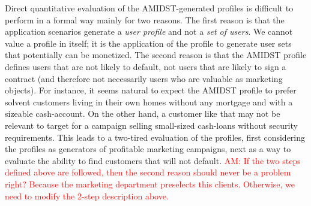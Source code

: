 \documentclass{article}
\theoremstyle{theorem}
\theoremstyle{definition}
\begin{document}
Direct quantitative evaluation of the AMIDST-generated profiles is difficult to perform in a formal way mainly for two reasons. The first reason is that the application scenarios generate a \textit{user profile} and not a \textit{set of users}. 
We cannot value a profile in itself; it is the application of the profile to generate user sets that potentially can be monetized. The second reason is that the AMIDST profile defines users that are not likely to default, not users that are likely to sign a contract (and therefore not necessarily users who are valuable as marketing objects). For instance, it seems natural to expect the AMIDST profile to prefer solvent customers living in their own homes without any mortgage and with a sizeable cash-account. On the other hand, a customer like that may not be relevant to target for a campaign selling small-sized cash-loans without security requirements. This leads to a two-tired evaluation of the profiles, first considering the profiles as generators of profitable marketing campaigns, next as a way to evaluate the ability to find customers that will not default.
\textcolor{red}{AM: If the two steps defined above are followed, then the second reason should never be a problem right? Because the marketing department preselects this clients. Otherwise, we need to modify the 2-step description above.}
\end{document}
